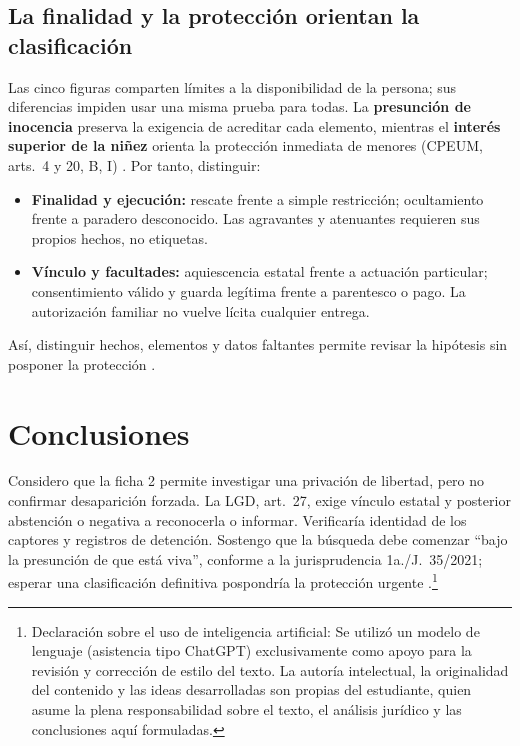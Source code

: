 \documentclass[spanish,letterpaper,oneside]{article}
\begin{document}
\subsection*{La finalidad y la protección orientan la clasificación}
Las cinco figuras comparten límites a la disponibilidad de la persona; sus diferencias impiden usar una misma prueba para todas. La \textbf{presunción de inocencia} preserva la exigencia de acreditar cada elemento, mientras el \textbf{interés superior de la niñez} orienta la protección inmediata de menores (CPEUM, arts.~4 y 20, B, I) \citep{cpeumS4Vigente}. Por tanto, distinguir:
\begin{itemize}[leftmargin=*,topsep=2pt,itemsep=2pt,parsep=0pt]
\item \textbf{Finalidad y ejecución:} rescate frente a simple restricción; ocultamiento frente a paradero desconocido. Las agravantes y atenuantes requieren sus propios hechos, no etiquetas.
\item \textbf{Vínculo y facultades:} aquiescencia estatal frente a actuación particular; consentimiento válido y guarda legítima frente a parentesco o pago. La autorización familiar no vuelve lícita cualquier entrega.
\end{itemize}
Así, distinguir hechos, elementos y datos faltantes permite revisar la hipótesis sin posponer la protección \citep{unadmPenalS5Material}.

\clearpage
\section{Conclusiones}
Considero que la ficha 2 permite investigar una privación de libertad, pero no confirmar desaparición forzada. La LGD, art.~27, exige vínculo estatal y posterior abstención o negativa a reconocerla o informar. Verificaría identidad de los captores y registros de detención. Sostengo que la búsqueda debe comenzar ``bajo la presunción de que está viva'', conforme a la jurisprudencia 1a./J.~35/2021; esperar una clasificación definitiva pospondría la protección urgente \citep{desaparicionS5,scjnBusquedaS5}.\footnote{Declaraci\'on sobre el uso de inteligencia artificial: Se utiliz\'o un modelo de lenguaje (asistencia tipo ChatGPT) exclusivamente como apoyo para la revisi\'on y correcci\'on de estilo del texto. La autor\'ia intelectual, la originalidad del contenido y las ideas desarrolladas son propias del estudiante, quien asume la plena responsabilidad sobre el texto, el an\'alisis jur\'idico y las conclusiones aqu\'i formuladas.}
\hypertarget{cuerpo-fin}{}
\end{document}
